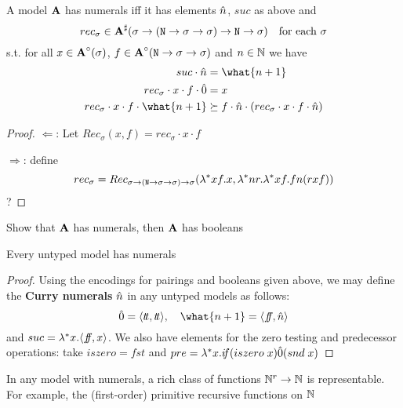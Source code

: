 \documentclass[11pt]{article}
\newcommand{\FF}{f\mspace{-7mu}f}
\newcommand{\TT}{t\mspace{-3mu}t}
\newcommand{\IF}{i\mspace{-4mu}f}
\begin{document}
\begin{proposition}[]
A model \(\operatorname{\textbf{A}}\) has numerals iff it has elements \(\hat{n}\), \(suc\) as above and
\begin{equation*}
rec_\sigma\in\operatorname{\textbf{A}}^\sharp(\sigma\to(\texttt{N}\to\sigma\to\sigma)\to\texttt{N}\to\sigma)\quad\text{for each }\sigma
\end{equation*}
s.t. for all \(x\in\operatorname{\textbf{A}}^\circ(\sigma)\), \(f\in\operatorname{\textbf{A}}^\circ(\texttt{N}\to\sigma\to\sigma)\) and \(n\in\mathbb{N}\) we have
\begin{align*}
suc\cdot\hatn&=\what{n+1}\\
rec_\sigma\cdot x\cdot f\cdot\hat{0}&=x\\
rec_\sigma\cdot x\cdot f\cdot\what{n+1}&\succeq f\cdot\hatn\cdot(rec_\sigma\cdot x\cdot f\cdot\hatn)
\end{align*}
\end{proposition}

\begin{proof}
\(\Leftarrow\): Let \(Rec_\sigma(x,f)=rec_\sigma\cdot x\cdot f\)

\(\Rightarrow\): define
\begin{equation*}
rec_\sigma=Rec_{\sigma\to(\texttt{N}\to\sigma\to\sigma)\to\sigma}(\lambda^*xf.x,\lambda^*nr.\lambda^*xf.fn(rxf))
\end{equation*}
?
\end{proof}

\begin{exercise}
Show that \(\operatorname{\textbf{A}}\) has numerals, then \(\operatorname{\textbf{A}}\) has booleans
\end{exercise}

\begin{proposition}[]
\label{3.3.13}
Every untyped model has numerals
\end{proposition}

\begin{proof}
Using the encodings for pairings and booleans given above, we may define the \textbf{Curry
numerals} \(\hat{n}\) in any untyped models as follows:
\begin{equation*}
\hat{0}=\la\TT,\TT\ra,\quad\what{n+1}=\la\FF,\hatn\ra
\end{equation*}
and \(suc=\lambda^*x.\la\FF,x\ra\). We also have elements for the zero testing and predecessor operations:
take \(iszero=fst\) and \(pre=\lambda^*x.\IF(iszero\;x)\hat{0}(snd\;x)\)
\end{proof}

In any model with numerals, a rich class of functions \(\mathbb{N}^r\to\mathbb{N}\) is representable. For example, the
(first-order) primitive recursive functions on \(\mathbb{N}\)
\end{document}
